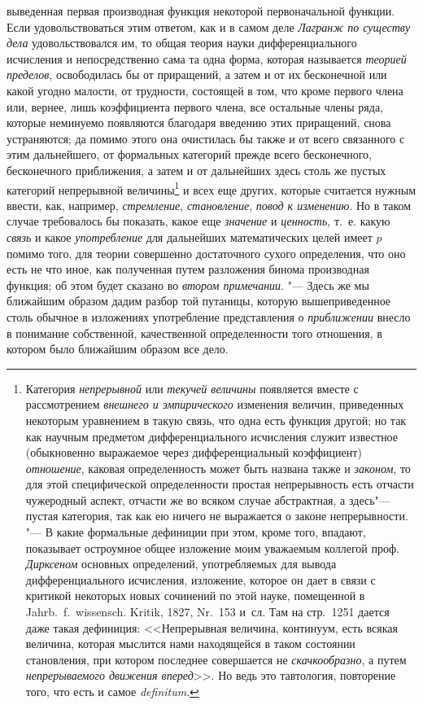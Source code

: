 выведенная первая производная функция некоторой первоначальной функции.
Если удовольствоваться этим ответом, как и в самом деле
{\em Лагранж по существу дела} удовольствовался им, то
общая теория науки дифференциального исчисления и непосредственно сама та
одна форма, которая называется {\em теорией пределов},
освободилась бы от приращений, а затем и от их бесконечной или какой угодно
малости, от трудности, состоящей в том, что кроме первого члена или,
вернее, лишь коэффициента первого члена, все остальные члены ряда, которые
неминуемо появляются благодаря введению этих приращений, снова устраняются;
да помимо этого она очистилась бы также и от всего связанного с этим
дальнейшего, от формальных категорий прежде всего бесконечного,
бесконечного приближения, а затем и от дальнейших здесь столь же пустых
категорий непрерывной величины\footnote{Категория
{\em непрерывной} или {\em текучей величины} появляется вместе с рассмотрением
{\em внешнего и эмпирического} изменения величин,
приведенных некоторым уравнением в такую
связь, что одна есть функция другой; но так как научным предметом
дифференциального исчисления служит известное (обыкновенно выражаемое через
дифференциальный коэффициент) {\em отношение}, каковая
определенность может быть названа также и {\em законом}, то для
этой специфической определенности простая непрерывность есть отчасти
чужеродный аспект, отчасти же во всяком случае абстрактная, а здесь"--- пустая
категория, так как ею ничего не выражается о законе непрерывности. "---
В какие формальные дефиниции при этом, кроме того, впадают,
показывает остроумное общее изложение моим уважаемым коллегой проф.
{\em Дирксеном} основных
определений, употребляемых для вывода дифференциального исчисления,
изложение, которое он дает в связи с критикой некоторых новых сочинений по
этой науке, помещенной в Jahrb.~f.~wissensch. Kritik, 1827, Nr.~153 и~сл.
Там на стр.~1251
дается даже такая дефиниция: <<Непрерывная величина, континуум, есть всякая
величина, которая мыслится нами находящейся в таком состоянии становления,
при котором последнее совершается не
{\em скачкообразно}, а путем {\em непрерываемого движения
вперед}>>. Но ведь это тавтология, повторение того, что есть
и самое {\em definitum}.} и всех еще других, которые
считается нужным ввести, как, например,
{\em стремление}, {\em становление}, {\em повод к изменению}.
Но в таком случае требовалось бы показать, какое еще
{\em значение} и {\em ценность}, т.~е. какую {\em связь} и какое
{\em употребление} для дальнейших математических целей
имеет $p$ помимо того, для теории совершенно
достаточного сухого определения, что оно есть не что иное, как полученная
путем разложения бинома производная функция; об этом будет сказано во
{\em втором примечании}. "--- Здесь же мы ближайшим
образом дадим разбор той путаницы, которую вышеприведенное столь обычное в
изложениях употребление представления о
{\em приближении} внесло в понимание собственной,
качественной определенности того отношения, в котором было ближайшим
образом все дело.


